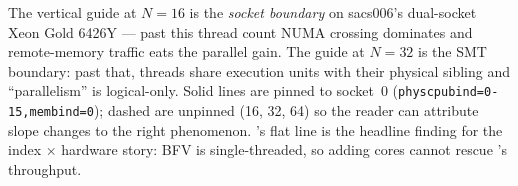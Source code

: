 The vertical guide at $N{=}16$ is the \emph{socket boundary} on
sacs006's dual-socket Xeon Gold 6426Y --- past this thread count
NUMA crossing dominates and remote-memory traffic eats the
parallel gain. The guide at $N{=}32$ is the SMT boundary: past
that, threads share execution units with their physical sibling
and ``parallelism'' is logical-only. Solid lines are pinned to
socket~0 (\texttt{physcpubind=0-15,membind=0}); dashed are
unpinned (16, 32, 64) so the reader can attribute slope changes
to the right phenomenon. \tiptoe's flat line is the headline
finding for the index $\times$ hardware story: BFV is
single-threaded, so adding cores cannot rescue \tiptoe's
throughput.
